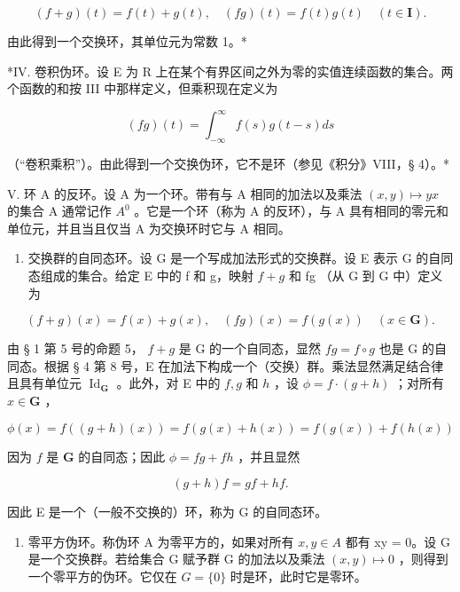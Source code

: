 \[
(f + g) (t) = f (t) + g (t), \quad (f g) (t) = f (t) g (t) \quad (t \in \mathbf {I}).
\]

由此得到一个交换环，其单位元为常数 1。*

*IV. 卷积伪环。设 E 为 R 上在某个有界区间之外为零的实值连续函数的集合。两个函数的和按 III 中那样定义，但乘积现在定义为

\[
(f g) (t) = \int_ {- \infty} ^ {\infty} f (s) g (t - s) d s
\]

（“卷积乘积”）。由此得到一个交换伪环，它不是环（参见《积分》VIII，§ 4）。*

V. 环 A 的反环。设 A 为一个环。带有与 A 相同的加法以及乘法 \((x,y)\mapsto yx\) 的集合 A 通常记作 \(A^{0}\) 。它是一个环（称为 A 的反环），与 A 具有相同的零元和单位元，并且当且仅当 A 为交换环时它与 A 相同。

\begin{enumerate}
\def\labelenumi{\Roman{enumi}.}
\setcounter{enumi}{5}
\tightlist
\item
  交换群的自同态环。设 G 是一个写成加法形式的交换群。设 E 表示 G 的自同态组成的集合。给定 E 中的 f 和 g，映射 \(f + g\) 和 fg （从 G 到 G 中）定义为
\end{enumerate}

\[
(f + g) (x) = f (x) + g (x), \quad (f g) (x) = f (g (x)) \quad (x \in \mathbf {G}).
\]

由 § 1 第 5 号的命题 5， \(f + g\) 是 G 的一个自同态，显然 \(fg = f \circ g\) 也是 G 的自同态。根据 § 4 第 8 号，E 在加法下构成一个（交换）群。乘法显然满足结合律且具有单位元 \(\operatorname{Id}_{\mathbf{G}}\) 。此外，对 E 中的 \(f, g\) 和 \(h\) ，设 \(\phi = f \cdot (g + h)\) ；对所有 \(x \in \mathbf{G}\) ，

\[
\phi (x) = f ((g + h) (x)) = f (g (x) + h (x)) = f (g (x)) + f (h (x))
\]

因为 \(f\) 是 \(\mathbf{G}\) 的自同态；因此 \(\phi = fg + fh\) ，并且显然

\[
(g + h) f = g f + h f.
\]

因此 E 是一个（一般不交换的）环，称为 G 的自同态环。

\begin{enumerate}
\def\labelenumi{\Roman{enumi}.}
\setcounter{enumi}{6}
\tightlist
\item
  零平方伪环。称伪环 A 为零平方的，如果对所有 \(x, y \in A\) 都有 xy = 0。设 G 是一个交换群。若给集合 G 赋予群 G 的加法以及乘法 \((x, y) \mapsto 0\) ，则得到一个零平方的伪环。它仅在 \(G = \{0\}\) 时是环，此时它是零环。
\end{enumerate}


